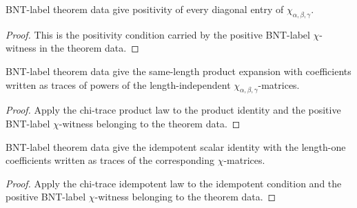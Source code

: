 \begin{theorem}%
    \label{thm:mpdo_bnt_label_theorem_data_chi_entry_pos}
    \leanok
    BNT-label theorem data give positivity of every diagonal entry of
    $\chi_{\alpha,\beta,\gamma}$.
\end{theorem}
\begin{proof}\leanok
    This is the positivity condition carried by the positive BNT-label
    $\chi$-witness in the theorem data.
\end{proof}

\begin{theorem}%
    \label{thm:mpdo_bnt_label_theorem_data_same_length_product_eq_sum_chi_trace_pow}
    \leanok
    BNT-label theorem data give the same-length product expansion with
    coefficients written as traces of powers of the length-independent
    $\chi_{\alpha,\beta,\gamma}$-matrices.
\end{theorem}
\begin{proof}\leanok
    Apply the chi-trace product law to the product identity and the positive
    BNT-label $\chi$-witness belonging to the theorem data.
\end{proof}

\begin{theorem}%
    \label{thm:mpdo_bnt_label_theorem_data_idempotent_eq_sum_chi_trace}
    \leanok
    BNT-label theorem data give the idempotent scalar identity with the
    length-one coefficients written as traces of the corresponding
    $\chi$-matrices.
\end{theorem}
\begin{proof}\leanok
    Apply the chi-trace idempotent law to the idempotent condition and the
    positive BNT-label $\chi$-witness belonging to the theorem data.
\end{proof}

